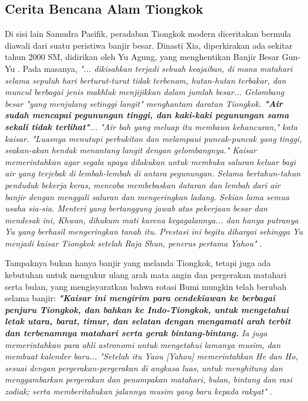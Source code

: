 \documentclass[10pt,twocolumn,letterpaper]{article}
\begin{document}
\subsection{Cerita Bencana Alam Tiongkok}

Di sisi lain Samudra Pasifik, peradaban Tiongkok modern diceritakan bermula diawali dari suatu peristiwa banjir besar. Dinasti Xia, diperkirakan ada sekitar tahun 2000 SM, didirikan oleh Yu Agung, yang menghentikan Banjir Besar Gun-Yu \cite{6}. Pada masanya, \textit{"... dikisahkan terjadi sebuah keajaiban, di mana matahari selama sepuluh hari berturut-turut tidak terbenam, hutan-hutan terbakar, dan muncul berbagai jenis makhluk menjijikkan dalam jumlah besar... Gelombang besar "yang menjulang setinggi langit" menghantam daratan Tiongkok. \textbf{"Air sudah mencapai pegunungan tinggi, dan kaki-kaki pegunungan sama sekali tidak terlihat"}... "Air bah yang meluap itu membawa kehancuran," kata kaisar. "Luasnya menutupi perbukitan dan melampaui puncak-puncak yang tinggi, seakan-akan hendak menantang langit dengan gelombangnya." Kaisar memerintahkan agar segala upaya dilakukan untuk membuka saluran keluar bagi air yang terjebak di lembah-lembah di antara pegunungan. Selama bertahun-tahun penduduk bekerja keras, mencoba membebaskan dataran dan lembah dari air banjir dengan menggali saluran dan mengeringkan ladang. Sekian lama semua usaha sia-sia. Menteri yang bertanggung jawab atas pekerjaan besar dan mendesak ini, Khwan, dihukum mati karena kegagalannya... dan hanya putranya Yu yang berhasil mengeringkan tanah itu. Prestasi ini begitu dihargai sehingga Yu menjadi kaisar Tiongkok setelah Raja Shun, penerus pertama Yahou"} \cite{5}.

Tampaknya bukan hanya banjir yang melanda Tiongkok, tetapi juga ada kebutuhan untuk mengukur ulang arah mata angin dan pergerakan matahari serta bulan, yang mengisyaratkan bahwa rotasi Bumi mungkin telah berubah selama banjir: \textit{\textbf{"Kaisar ini mengirim para cendekiawan ke berbagai penjuru Tiongkok, dan bahkan ke Indo-Tiongkok, untuk mengetahui letak utara, barat, timur, dan selatan dengan mengamati arah terbit dan terbenamnya matahari serta gerak bintang-bintang.} Ia juga memerintahkan para ahli astronomi untuk mengetahui lamanya musim, dan membuat kalender baru... "Setelah itu Yaou [Yahou] memerintahkan He dan Ho, sesuai dengan pergerakan-pergerakan di angkasa luas, untuk menghitung dan menggambarkan pergerakan dan penampakan matahari, bulan, bintang dan rasi zodiak; serta memberitahukan jalannya musim yang baru kepada rakyat"} \cite{5}.
\end{document}

